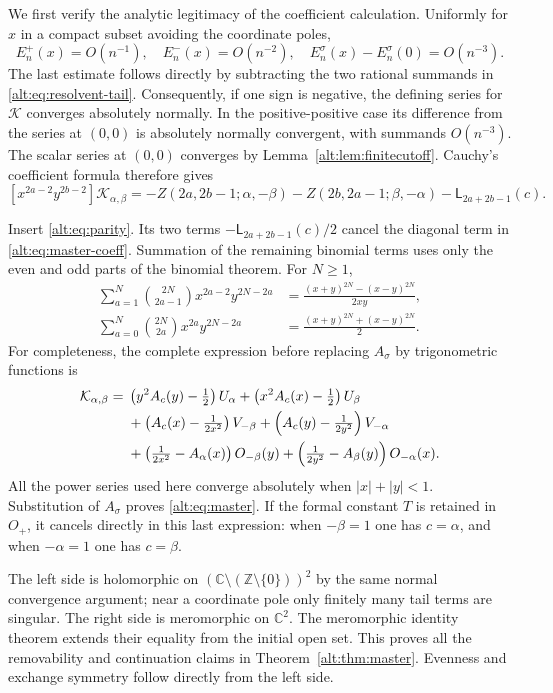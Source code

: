 \documentclass[11pt]{article}
\theoremstyle{definition}
\theoremstyle{remark}
\numberwithin{equation}{section}
\begin{document}
We first verify the analytic legitimacy of the coefficient calculation.
Uniformly for $x$ in a compact subset avoiding the coordinate poles,
\[
 E_n^+(x)=O(n^{-1}),\quad E_n^-(x)=O(n^{-2}),\quad
 E_n^\sigma(x)-E_n^\sigma(0)=O(n^{-3}).
\]
The last estimate follows directly by subtracting the two rational
summands in \eqref{alt:eq:resolvent-tail}. Consequently, if one sign is
negative, the defining series for $\mathcal K$ converges absolutely
normally. In the positive-positive case its difference from the series
at $(0,0)$ is absolutely normally convergent, with summands $O(n^{-3})$.
The scalar series at $(0,0)$ converges by Lemma~\ref{alt:lem:finitecutoff}.
Cauchy's coefficient formula therefore gives
\begin{equation}\label{alt:eq:master-coeff}
 [x^{2a-2}y^{2b-2}]\mathcal K_{\alpha,\beta}
 =-Z(2a,2b-1;\alpha,-\beta)
  -Z(2b,2a-1;\beta,-\alpha)
  -\mathsf L_{2a+2b-1}(c).
\end{equation}

Insert \eqref{alt:eq:parity}. Its two terms
$-\mathsf L_{2a+2b-1}(c)/2$ cancel the diagonal term in
\eqref{alt:eq:master-coeff}. Summation of the remaining binomial terms
uses only the even and odd parts of the binomial theorem. For $N\ge1$,
\begin{align*}
 \sum_{a=1}^{N}\binom{2N}{2a-1}x^{2a-2}y^{2N-2a}
 &=\frac{(x+y)^{2N}-(x-y)^{2N}}{2xy},\\
 \sum_{a=0}^{N}\binom{2N}{2a}x^{2a}y^{2N-2a}
 &=\frac{(x+y)^{2N}+(x-y)^{2N}}2.
\end{align*}
For completeness, the complete expression before replacing $A_\sigma$
by trigonometric functions is
\begin{align}
 \mathcal K_{\alpha,\beta}
 ={}&\left(y^2A_c(y)-\tfrac12\right)U_\alpha
    +\left(x^2A_c(x)-\tfrac12\right)U_\beta\notag\\
 &+\left(A_c(x)-\tfrac1{2x^2}\right)V_{-\beta}
    +\left(A_c(y)-\tfrac1{2y^2}\right)V_{-\alpha}\notag\\
 &+\left(\tfrac1{2x^2}-A_\alpha(x)\right)O_{-\beta}(y)
    +\left(\tfrac1{2y^2}-A_\beta(y)\right)O_{-\alpha}(x).
 \label{alt:eq:master-before-trig}
\end{align}
All the power series used here converge absolutely when
$|x|+|y|<1$. Substitution of $A_\sigma$ proves
\eqref{alt:eq:master}. If the formal constant $T$ is retained in $O_+$,
it cancels directly in this last expression: when $-\beta=1$ one has
$c=\alpha$, and when $-\alpha=1$ one has $c=\beta$.

The left side is holomorphic on
$(\mathbb C\setminus(\mathbb Z\setminus\{0\}))^2$ by the same normal
convergence argument; near a coordinate pole only finitely many tail
terms are singular. The right side is meromorphic on $\mathbb C^2$.
The meromorphic identity theorem extends their equality from the
initial open set. This proves all the removability and continuation
claims in Theorem~\ref{alt:thm:master}. Evenness and exchange symmetry
follow directly from the left side.
\end{document}
